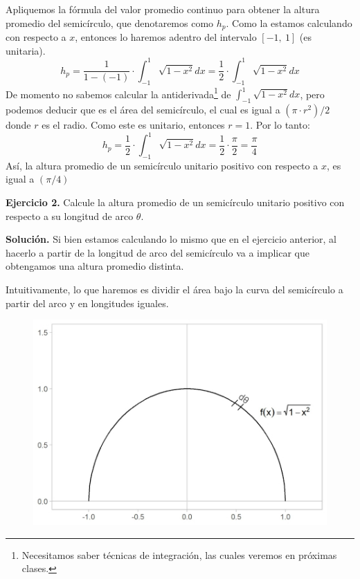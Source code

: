 \documentclass[12pt]{article}
\begin{document}
Apliquemos la fórmula del valor promedio continuo para obtener la altura promedio del semicírculo, que denotaremos como $h_{p}$. Como la estamos calculando con respecto a $x$, entonces lo haremos adentro del intervalo $[-1, \ 1]$ (es unitaria).
\[
  h_{p} = \frac{1}{1 - (-1)} \cdot \int_{-1}^{1} \sqrt{1 - x^{2}}dx = \frac{1}{2} \cdot \int_{-1}^{1} \sqrt{1 - x^{2}}dx
\]
De momento no sabemos calcular la antiderivada\footnote{Necesitamos saber técnicas de integración, las cuales veremos en próximas clases.} de $\int_{-1}^{1} \sqrt{1 - x^{2}}dx$, pero podemos deducir que es el área del semicírculo, el cual es igual a $(\pi \cdot r^{2})/2$ donde $r$ es el radio. Como este es unitario, entonces $r = 1$. Por lo tanto:
\[
  h_{p} = \frac{1}{2} \cdot \int_{-1}^{1} \sqrt{1 - x^{2}}dx = \frac{1}{2} \cdot \frac{\pi}{2} = \frac{\pi}{4}
\]
Así, la altura promedio de un semicírculo unitario positivo con respecto a $x$, es igual a $(\pi/4)$

\textbf{Ejercicio 2.} Calcule la altura promedio de un semicírculo unitario positivo con respecto a su longitud de arco $\theta$.

\textbf{Solución.} Si bien estamos calculando lo mismo que en el ejercicio anterior, al hacerlo a partir de la longitud de arco del semicírculo va a implicar que obtengamos una altura promedio distinta.

Intuitivamente, lo que haremos es dividir el área bajo la curva del semicírculo a partir del arco y en longitudes iguales.

\begin{figure}[hbt!]
\centering
\includegraphics[scale=0.6]{img/avg-val-ex-2.jpg}
\end{figure}
\end{document}
